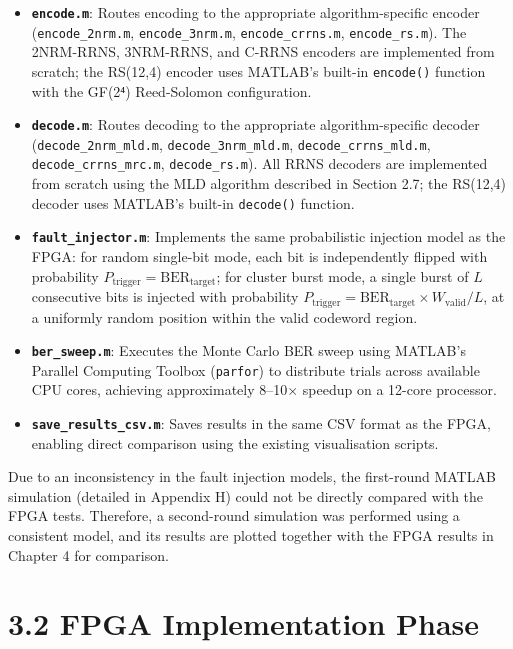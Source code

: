 \documentclass[
  12pt,
  a4paper]{report}
\providecommand{\tightlist}{%
  \setlength{\itemsep}{0pt}\setlength{\parskip}{0pt}}
\begin{document}
\begin{itemize}
\tightlist
\item
  \textbf{\texttt{encode.m}}: Routes encoding to the appropriate
  algorithm-specific encoder (\texttt{encode\_2nrm.m},
  \texttt{encode\_3nrm.m}, \texttt{encode\_crrns.m},
  \texttt{encode\_rs.m}). The 2NRM-RRNS, 3NRM-RRNS, and C-RRNS encoders
  are implemented from scratch; the RS(12,4) encoder uses MATLAB's
  built-in \texttt{encode()} function with the GF(2⁴) Reed-Solomon
  configuration.
\item
  \textbf{\texttt{decode.m}}: Routes decoding to the appropriate
  algorithm-specific decoder (\texttt{decode\_2nrm\_mld.m},
  \texttt{decode\_3nrm\_mld.m}, \texttt{decode\_crrns\_mld.m},
  \texttt{decode\_crrns\_mrc.m}, \texttt{decode\_rs.m}). All RRNS
  decoders are implemented from scratch using the MLD algorithm
  described in Section 2.7; the RS(12,4) decoder uses MATLAB's built-in
  \texttt{decode()} function.
\item
  \textbf{\texttt{fault\_injector.m}}: Implements the same probabilistic
  injection model as the FPGA: for random single-bit mode, each bit is
  independently flipped with probability
  \(P_{\text{trigger}} = \text{BER}_{\text{target}}\); for cluster burst
  mode, a single burst of \(L\) consecutive bits is injected with
  probability
  \(P_{\text{trigger}} = \text{BER}_{\text{target}} \times W_{\text{valid}} / L\),
  at a uniformly random position within the valid codeword region.
\item
  \textbf{\texttt{ber\_sweep.m}}: Executes the Monte Carlo BER sweep
  using MATLAB's Parallel Computing Toolbox (\texttt{parfor}) to
  distribute trials across available CPU cores, achieving approximately
  8--10× speedup on a 12-core processor.
\item
  \textbf{\texttt{save\_results\_csv.m}}: Saves results in the same CSV
  format as the FPGA, enabling direct comparison using the existing
  visualisation scripts.
\end{itemize}

Due to an inconsistency in the fault injection models, the first-round
MATLAB simulation (detailed in Appendix H) could not be directly
compared with the FPGA tests. Therefore, a second-round simulation was
performed using a consistent model, and its results are plotted together
with the FPGA results in Chapter 4 for comparison.

\section{3.2 FPGA Implementation Phase}\label{fpga-implementation-phase}
\end{document}
